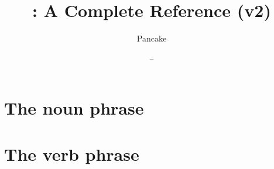 \documentclass[12pt, a4paper, english]{pancake-book}
\begin{document}
\title{\langname : A Complete Reference (v2)}
\author{Pancake}
\date{ -- \DTMtoday}

\frontmatter

\maketitle
\tableofcontents

\printglossaries
\mainmatter


\chapter{The noun phrase}

\filbreak





\chapter{The verb phrase}


\end{document}
